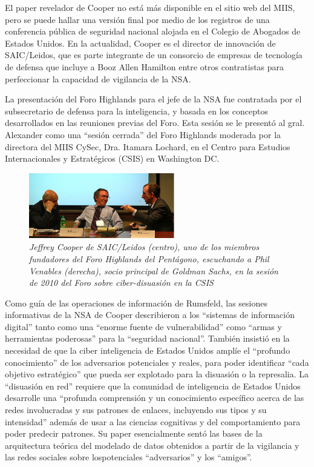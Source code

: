 \documentclass[10pt,a5paper,twoside,spanish,]{book}
\begin{document}
El paper revelador de Cooper no está más disponible en el sitio web del
MIIS, pero se puede hallar una versión final por medio de los registros
de una conferencia pública de seguridad nacional alojada en el Colegio
de Abogados de Estados Unidos. En la actualidad, Cooper es el director
de innovación de SAIC/Leidos, que es parte integrante de un consorcio de
empresas de tecnología de defensa que incluye a Booz Allen Hamilton
entre otros contratistas para perfeccionar la capacidad de vigilancia de
la NSA.

La presentación del Foro Highlands para el jefe de la NSA fue contratada
por el subsecretario de defensa para la inteligencia, y basada en los
conceptos desarrollados en las reuniones previas del Foro. Esta sesión
se le presentó al gral. Alexander como una ``sesión cerrada'' del Foro
Highlands moderada por la directora del MIIS CySec, Dra. Itamara
Lochard, en el Centro para Estudios Internacionales y Estratégicos
(CSIS) en Washington DC.

\begin{figure}[htbp]
\centering
\includegraphics{2.2.png}
\caption{\emph{Jeffrey Cooper de SAIC/Leidos (centro), uno de los
miembros fundadores del Foro Highlands del Pentágono, escuchando a Phil
Venables (derecha), socio principal de Goldman Sachs, en la sesión de
2010 del Foro sobre ciber-disuasión en la CSIS}}
\end{figure}

Como guía de las operaciones de información de Rumsfeld, las sesiones
informativas de la NSA de Cooper describieron a los ``sistemas de
información digital'' tanto como una ``enorme fuente de vulnerabilidad''
como ``armas y herramientas poderosas'' para la ``seguridad nacional''.
También insistió en la necesidad de que la ciber inteligencia de Estados
Unidos amplíe el ``profundo conocimiento'' de los adversarios
potenciales y reales, para poder identificar ``cada objetivo
estratégico'' que pueda ser explotado para la disuasión o la represalia.
La ``disuasión en red'' requiere que la comunidad de inteligencia de
Estados Unidos desarrolle una ``profunda comprensión y un conocimiento
específico acerca de las redes involucradas y sus patrones de enlaces,
incluyendo sus tipos y su intensidad'' además de usar a las ciencias
cognitivas y del comportamiento para poder predecir patrones. Su paper
esencialmente sentó las bases de la arquitectura teórica del modelado de
datos obtenidos a partir de la vigilancia y las redes sociales sobre
lospotenciales ``adversarios'' y los ``amigos''.
\end{document}

